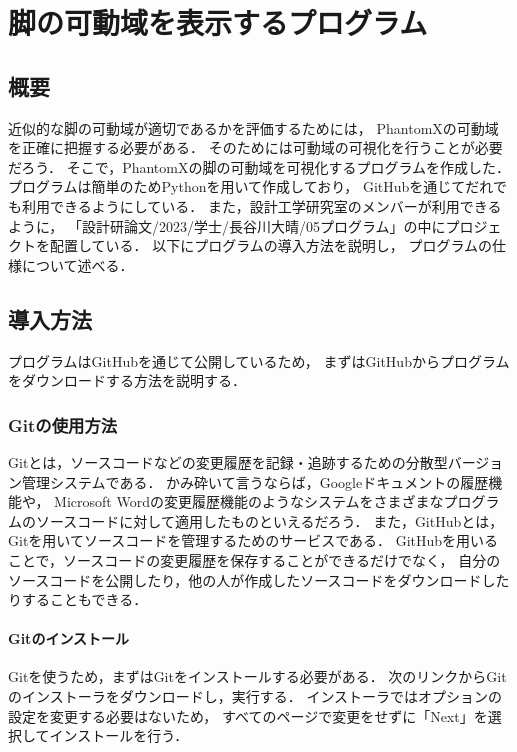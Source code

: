 ﻿

\chapter{脚の可動域を表示するプログラム}\label{chapter:leg_range_python}

\section{概要}
近似的な脚の可動域が適切であるかを評価するためには，
PhantomXの可動域を正確に把握する必要がある．
そのためには可動域の可視化を行うことが必要だろう．
そこで，PhantomXの脚の可動域を可視化するプログラムを作成した．
プログラムは簡単のためPythonを用いて作成しており，
GitHubを通じてだれでも利用できるようにしている．
また，設計工学研究室のメンバーが利用できるように，
「設計研論文/2023/学士/長谷川大晴/05プログラム」の中にプロジェクトを配置している．
以下にプログラムの導入方法を説明し，
プログラムの仕様について述べる．

\section{導入方法}
プログラムはGitHubを通じて公開しているため，
まずはGitHubからプログラムをダウンロードする方法を説明する．

\subsection{Gitの使用方法}
Gitとは，ソースコードなどの変更履歴を記録・追跡するための分散型バージョン管理システムである．
かみ砕いて言うならば，Googleドキュメントの履歴機能や，
Microsoft Wordの変更履歴機能のようなシステムをさまざまなプログラムのソースコードに対して適用したものといえるだろう．
また，GitHubとは，Gitを用いてソースコードを管理するためのサービスである．
GitHubを用いることで，ソースコードの変更履歴を保存することができるだけでなく，
自分のソースコードを公開したり，他の人が作成したソースコードをダウンロードしたりすることもできる．

\subsubsection{Gitのインストール}
Gitを使うため，まずはGitをインストールする必要がある．
次のリンクからGitのインストーラをダウンロードし，実行する．
インストーラではオプションの設定を変更する必要はないため，
すべてのページで変更をせずに「Next」を選択してインストールを行う．

